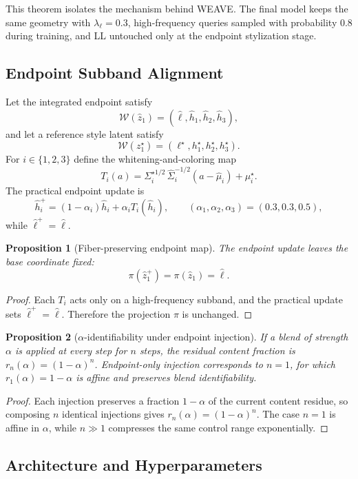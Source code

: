 \documentclass[10pt,letterpaper]{article}
\newtheorem*{sproposition}{Proposition}
\begin{document}
This theorem isolates the mechanism behind WEAVE. The final model keeps the same geometry with $\lambda_\ell=0.3$, high-frequency queries sampled with probability $0.8$ during training, and LL untouched only at the endpoint stylization stage.

\subsection{Endpoint Subband Alignment}
\label{sec:endpoint}

Let the integrated endpoint satisfy
\[
\mathcal W(\hat z_1) = (\hat \ell,\hat h_1,\hat h_2,\hat h_3),
\]
and let a reference style latent satisfy
\[
\mathcal W(z_1^\star) = (\ell^\star,h_1^\star,h_2^\star,h_3^\star).
\]
For $i\in\{1,2,3\}$ define the whitening-and-coloring map
\[
T_i(a) = \Sigma_i^{\star 1/2}\,\hat\Sigma_i^{-1/2}(a-\hat\mu_i)+\mu_i^\star.
\]
The practical endpoint update is
\[
\hat h_i^+ = (1-\alpha_i)\hat h_i + \alpha_i T_i(\hat h_i),
\qquad
(\alpha_1,\alpha_2,\alpha_3)=(0.3,0.3,0.5),
\]
while $\hat \ell^+ = \hat \ell$.

\begin{sproposition}[Fiber-preserving endpoint map]
The endpoint update leaves the base coordinate fixed:
\[
\pi(\hat z_1^+) = \pi(\hat z_1) = \hat \ell.
\]
\end{sproposition}
\begin{proof}
Each $T_i$ acts only on a high-frequency subband, and the practical update sets $\hat \ell^+ = \hat \ell$. Therefore the projection $\pi$ is unchanged.
\end{proof}

\begin{sproposition}[$\alpha$-identifiability under endpoint injection]
If a blend of strength $\alpha$ is applied at every step for $n$ steps, the residual content fraction is $r_n(\alpha)=(1-\alpha)^n$. Endpoint-only injection corresponds to $n=1$, for which $r_1(\alpha)=1-\alpha$ is affine and preserves blend identifiability.
\end{sproposition}
\begin{proof}
Each injection preserves a fraction $1-\alpha$ of the current content residue, so composing $n$ identical injections gives $r_n(\alpha)=(1-\alpha)^n$. The case $n=1$ is affine in $\alpha$, while $n\gg1$ compresses the same control range exponentially.
\end{proof}

\subsection{Architecture and Hyperparameters}
\label{sec:hyper}
\end{document}
